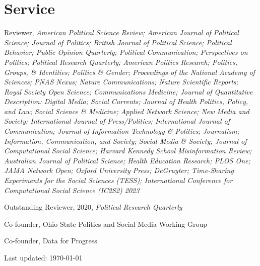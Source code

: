 \documentclass[letterpaper]{article}
\renewenvironment{itemize}{
  \begin{list}{}{
    \setlength{\leftmargin}{1.5em}
  }
}{
  \end{list}
}
\begin{document}
\section*{Service}

\begin{itemize}
\item Reviewer, \textit{American Political Science Review; American Journal of Political Science; Journal of Politics; British Journal of Political Science; Political Behavior; Public Opinion Quarterly; Political Communication; Perspectives on Politics; Political Research Quarterly; American Politics Research; Politics, Groups, \& Identities; Politics \& Gender; Proceedings of the National Academy of Sciences; PNAS Nexus; Nature Communications; Nature Scientific Reports; Royal Society Open Science; Communications Medicine; Journal of Quantitative Description: Digital Media; Social Currents; Journal of Health Politics, Policy, and Law; Social Science \& Medicine; Applied Network Science; New Media and Society; International Journal of Press/Politics; International Journal of Communication; Journal of Information Technology \& Politics; Journalism; Information, Communication, and Society; Social Media \& Society; Journal of Computational Social Science; Harvard Kennedy School Misinformation Review; Australian Journal of Political Science; Health Education Research; PLOS One; JAMA Network Open; Oxford University Press; DeGruyter; Time-Sharing Experiments for the Social Sciences (TESS); International Conference for Computational Social Science (IC2S2) 2023}
\begin{itemize}
Outstanding Reviewer, 2020, \textit{Political Research Quarterly}
\end{itemize}
\item Co-founder, Ohio State Politics and Social Media Working Group
\item Co-founder, Data for Progress
\end{itemize}

\begin{center}
  \begin{footnotesize}
    Last updated: \today
      \end{footnotesize}
\end{center}
\end{document}
